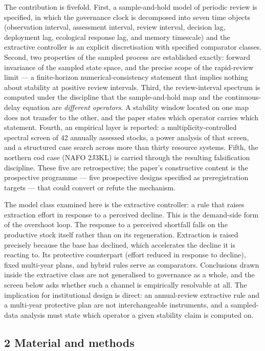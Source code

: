 \documentclass[11pt]{article}
\begin{document}
The contribution is fivefold. First, a sample-and-hold model of periodic
review is specified, in which the governance clock is decomposed into
seven time objects (observation interval, assessment interval, review
interval, decision lag, deployment lag, ecological response lag, and
memory timescale) and the extractive controller is an explicit
discretisation with specified comparator classes. Second, two properties
of the sampled process are established exactly: forward invariance of
the sampled state space, and the precise scope of the rapid-review limit
--- a finite-horizon numerical-consistency statement that implies
nothing about stability at positive review intervals. Third, the
review-interval spectrum is computed under the discipline that the
sample-and-hold map and the continuous-delay equation are
\emph{different operators}. A stability window located on one map does
not transfer to the other, and the paper states which operator carries
which statement. Fourth, an empirical layer is reported: a multiplicity-controlled spectral screen of 42
annually assessed stocks, a power analysis of that screen, and a
structured case search across more than thirty resource systems. Fifth,
the northern cod case (NAFO 2J3KL) is carried through the resulting
falsification discipline. These five are retrospective; the paper's
constructive content is the prospective programme --- five prospective designs
specified as preregistration targets --- that could
convert or refute the mechanism.

The model class examined here is the extractive controller: a rule that
raises extraction effort in response to a perceived decline. This is the
demand-side form of the overshoot loop. The response to a perceived
shortfall falls on the productive stock itself rather than on its
regeneration. Extraction is raised precisely because the base has
declined, which accelerates the decline it is reacting to. Its
protective counterpart (effort reduced in response to decline), fixed
multi-year plans, and hybrid rules serve as comparators.
Conclusions drawn inside the extractive class are not generalised to
governance as a whole, and the screen below asks whether such a channel
is empirically resolvable at all. The implication for institutional
design is direct: an annual-review extractive rule and a multi-year
protective plan are not interchangeable instruments, and a sampled-data
analysis must state which operator a given stability claim is computed
on.

\subsection{2 Material and methods}\label{material-and-methods}
\end{document}
